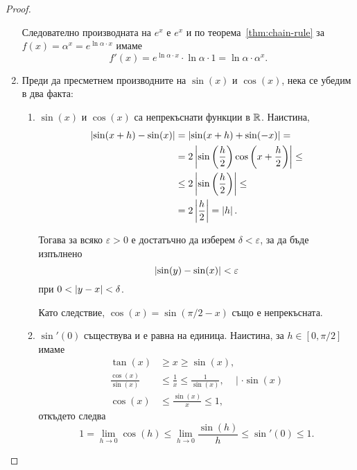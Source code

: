 \documentclass[numbers=endperiod, DIV=15, bibliography=totocnumbered]{scrartcl}
\begin{document}
\begin{proof}
\begin{enumerate}
    Следователно производната на $e^x$ е $e^x$ и по теорема~\ref{thm:chain-rule} за $f(x) = \alpha^x = e^{\ln \alpha \cdot x}$ имаме
    \begin{displaymath}
      f'(x)
      =
      e^{\ln \alpha \cdot x} \cdot \ln \alpha \cdot 1
      =
      \ln \alpha \cdot \alpha^x.
    \end{displaymath}

    \item Преди да пресметнем производните на $\sin(x)$ и $\cos(x)$, нека се убедим в два факта:
    \begin{enumerate}
      \item $\sin(x)$ и $\cos(x)$ са непрекъснати функции в $\mathbb{R}$. Наистина,
      \begin{align*}
        \left\vert \sin(x+h) - \sin(x) \right\vert
        &=
        \left\vert \sin(x+h) + \sin(-x) \right\vert
        = \\ &=
        2 \left\vert \sin\left(\frac h 2 \right) \cos \left( x+ \frac h 2 \right) \right\vert
        \leq \\ &\leq
        2 \left\vert \sin\left(\frac h 2 \right) \right\vert
        \leq \\ &=
        2 \left\vert \frac h 2 \right\vert
        =
        \left\vert h \right\vert.
      \end{align*}

      Тогава за всяко $\varepsilon > 0$ е достатъчно да изберем $\delta < \varepsilon$, за да бъде изпълнено
      \begin{displaymath}
        \left\vert \sin(y) - \sin(x) \right\vert < \varepsilon
      \end{displaymath}
      при $0 < \left\vert y - x \right\vert < \delta$.

      Като следствие, $\cos(x) = \sin(\pi / 2 - x)$ също е непрекъсната.

      \item $\sin'(0)$ съществува и е равна на единица. Наистина, за $h \in [0, \pi / 2]$ имаме
      \begin{align*}
        \tan(x) &\geq x \geq \sin(x),
        \\
        \frac {\cos(x)} {\sin(x)} &\leq \frac 1 x \leq \frac 1 {\sin(x)},~~~~\mid \cdot \sin(x)
        \\
        \cos(x) &\leq \frac {\sin(x)} x \leq 1,
      \end{align*}
      откъдето следва
      \begin{displaymath}
        1
        =
        \lim_{h \to 0} \cos(h)
        \leq
        \lim_{h \to 0} \frac {\sin(h)} h
        \leq
        \sin'(0)
        \leq
        1.
      \end{displaymath}
    \end{enumerate}


\end{enumerate}
\end{proof}
\end{document}
